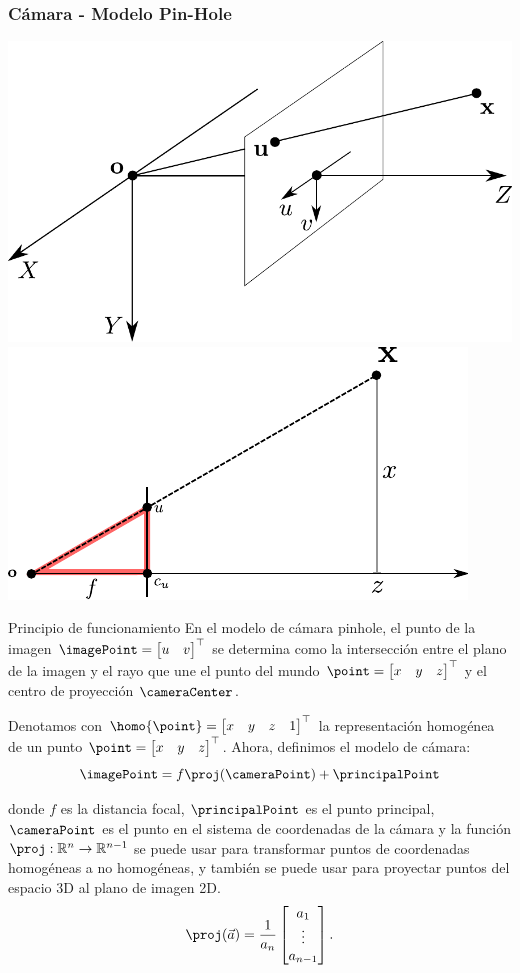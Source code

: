 \begin{frame}
	\frametitle{Cámara - Modelo Pin-Hole}
	
	
	\includegraphics[width=0.4\columnwidth]{images/camera/pinhole_camera_model.pdf}
	\includegraphics[width=0.4\columnwidth]{images/camera/pinhole_camera_model2.pdf}
	\footnotesize
	
	\begin{block}{Principio de funcionamiento}
		En el modelo de cámara pinhole, el punto de la imagen $\imagePoint=\begin{bmatrix}u & v\end{bmatrix}^{\top}$ se determina como la intersección entre el plano de la imagen y el rayo que une el punto del mundo $\point =\begin{bmatrix}x & y & z\end{bmatrix}^{\top}$ y el centro de proyección $\cameraCenter$.
	\end{block}
	
	Denotamos con $\homo{\point}=\begin{bmatrix}x & y & z & 1\end{bmatrix}^{\top}$ la representación homogénea de un punto $\point=\begin{bmatrix}x & y & z\end{bmatrix}^{\top}$. Ahora, definimos el modelo de cámara:
	\begin{equation*}
		\imagePoint=f\proj(\cameraPoint)+\principalPoint
	\end{equation*}
	
	donde $f$ es la distancia focal, $\principalPoint$ es el punto principal, $\cameraPoint$ es el punto en el sistema de coordenadas de la cámara y la función $\proj:\mathbb{R}^{n}\rightarrow\mathbb{R}^{n- 1}$ se puede usar para transformar puntos de coordenadas homogéneas a no homogéneas, y también se puede usar para proyectar puntos del espacio 3D al plano de imagen 2D.
	\begin{equation*}
		\proj(\vec{a})=
		\frac{1}{a_{n}}\begin{bmatrix}a_{1}\\
			\vdots\\
			a_{n-1}
		\end{bmatrix}.
	\end{equation*}
	

\end{frame}
